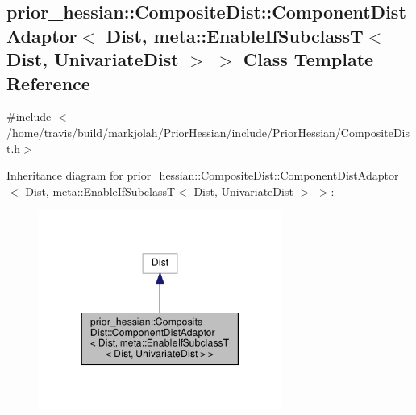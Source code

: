 \hypertarget{classprior__hessian_1_1CompositeDist_1_1ComponentDistAdaptor_3_01Dist_00_01meta_1_1EnableIfSubclc6c9bd83bba546a81e521c87ad7ee6d3}{}\subsection{prior\+\_\+hessian\+:\+:Composite\+Dist\+:\+:Component\+Dist\+Adaptor$<$ Dist, meta\+:\+:Enable\+If\+SubclassT$<$ Dist, Univariate\+Dist $>$ $>$ Class Template Reference}
\label{classprior__hessian_1_1CompositeDist_1_1ComponentDistAdaptor_3_01Dist_00_01meta_1_1EnableIfSubclc6c9bd83bba546a81e521c87ad7ee6d3}


{\ttfamily \#include $<$/home/travis/build/markjolah/\+Prior\+Hessian/include/\+Prior\+Hessian/\+Composite\+Dist.\+h$>$}



Inheritance diagram for prior\+\_\+hessian\+:\+:Composite\+Dist\+:\+:Component\+Dist\+Adaptor$<$ Dist, meta\+:\+:Enable\+If\+SubclassT$<$ Dist, Univariate\+Dist $>$ $>$\+:\nopagebreak
\begin{figure}[H]
\begin{center}
\leavevmode
\includegraphics[width=226pt]{classprior__hessian_1_1CompositeDist_1_1ComponentDistAdaptor_3_01Dist_00_01meta_1_1EnableIfSubclc7af0e79fb22780a80a4ae3c25e07410}
\end{center}
\end{figure}


